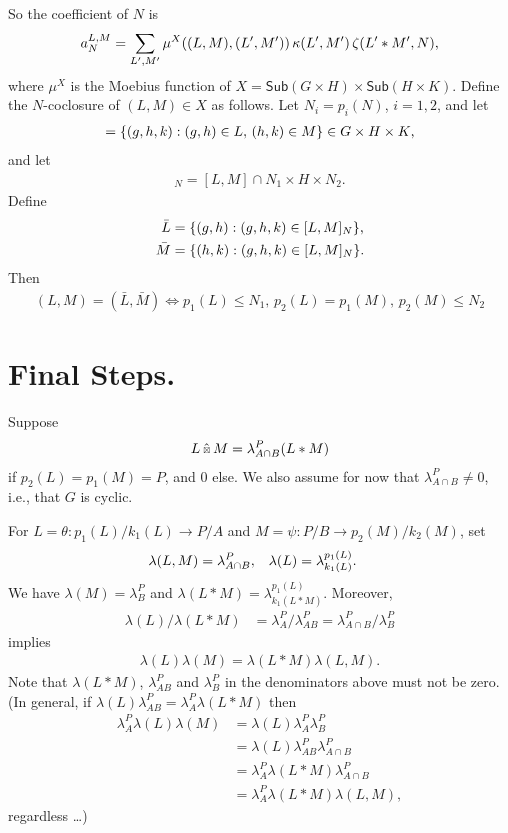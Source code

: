 \documentclass[12pt,a4paper]{amsart}
\newcommand{\Sub}{\mathsf{Sub}}
\newcommand{\kstarhat}{\mathbin{\hat{\scalebox{0.61}{$\boxtimes$}}}}
\begin{document}
So the coefficient of $N$ is
\begin{align*}
  a^{L,M}_N = \sum_{L',M'} \mu^X((L, M), (L', M'))\,  \kappa(L', M') \, \zeta(L' * M', N)\text,
\end{align*}
where $\mu^X$ is the Moebius function of $X = \Sub(G \times H) \times \Sub(H \times K)$.  Define the $N$-coclosure of $(L, M) \in X$ as follows.
Let $N_i = p_i(N)$, $i = 1,2$, and let
\begin{align*}
  [L, M] = \{(g, h, k) : (g, h) \in L,\, (h, k) \in M\} \in G \times H \times K\text,
\end{align*}
and let
\begin{align*}
  [L, M]_N = [L, M] \cap N_1 \times H \times N_2.
\end{align*}
Define
\begin{align*}
  \bar{L} &= \{(g,h) : (g,h,k) \in [L, M]_N\}\text,\\
  \bar{M} &= \{(h,k) : (g,h,k) \in [L, M]_N\}\text.
\end{align*}
Then
\begin{align*}
  (L, M) = (\bar{L}, \bar{M}) \iff
p_1(L) \leq N_1,\, p_2(L) = p_1(M),\, p_2(M) \leq N_2
\end{align*}

\section{Final Steps.}
\label{sec:final-step}

Suppose
\begin{align*}
  L \kstarhat M = \lambda^P_{A \cap B} (L * M)
\end{align*}
if $p_2(L) = p_1(M) = P$, and $0$ else.  We also assume for now that
$\lambda^P_{A \cap B} \neq 0$, i.e., that $G$ is cyclic.

For $L = \theta \colon p_1(L)/k_1(L) \to P/A$
and $M = \psi \colon P/B \to p_2(M)/k_2(M)$, set
\begin{align*}
  \lambda(L, M) &= \lambda^P_{A \cap B}, &
  \lambda(L) &= \lambda^{p_1(L)}_{k_1(L)}\text.
\end{align*}
We have $\lambda(M) = \lambda^P_B$ and $\lambda(L * M) = \lambda^{p_1(L)}_{k_1(L*M)}$.
Moreover,
\begin{align*}
  \lambda(L) / \lambda(L * M) &= \lambda^P_A / \lambda^P_{AB} = \lambda^P_{A \cap B} / \lambda^P_B
\end{align*}
implies
\begin{align*}
  \lambda(L) \lambda(M)
  = \lambda(L * M) \lambda(L, M).
\end{align*}
Note that $\lambda(L * M)$, $\lambda^P_{AB}$ and $\lambda^P_B$ in the denominators above
must not be zero.
(In general, if $\lambda(L) \lambda^P_{AB} = \lambda^P_A \lambda(L * M)$ then
\begin{align*}
  \lambda^P_A \lambda(L) \lambda(M)
  &=   \lambda(L) \lambda^P_A \lambda^P_B \\
  &=   \lambda(L) \lambda^P_{AB} \lambda^P_{A \cap B} \\
  &=   \lambda^P_A \lambda(L * M) \lambda^P_{A \cap B} \\
  &=   \lambda^P_A \lambda(L * M) \lambda(L, M),
\end{align*}
regardless \ldots)
\end{document}

